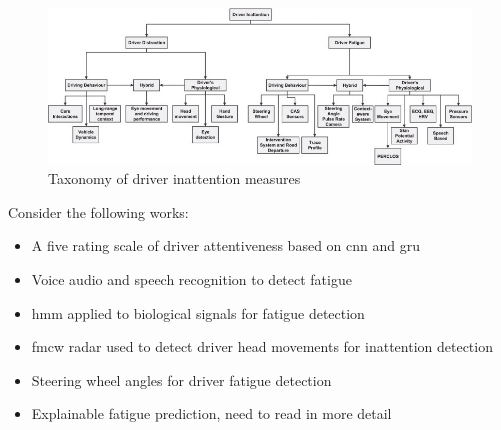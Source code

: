 \documentclass[11pt, parskip=half*,twoside=false]{scrbook}
\begin{document}
\begin{figure} 
	\centering
	\includegraphics[width=\textwidth]{inattention_inputs_taxonomy} 
	\caption{Taxonomy of driver inattention measures}
	\label{fig:taxonomy_measures}
\end{figure}

Consider the following works:
\begin{itemize}
	\item \citet{duaAutoRateHowAttentive2019}  A five rating scale of driver attentiveness based on \gls{cnn} and \gls{gru}
	\item \citet{greeleyDetectingFatigueVoice2006} Voice audio and speech recognition to detect fatigue
	\item \citet{fuDynamicDriverFatigue2016} \gls{hmm} applied to biological signals for fatigue detection
	\item \citet{dingInattentiveDrivingBehavior2019} \gls{fmcw} radar used to detect driver head movements for inattention detection
	\item \citet{liOnlineDetectionDriver2017} Steering wheel angles for driver fatigue detection
	\item \citet{zhouPredictingDriverFatigue2021} Explainable fatigue prediction, need to read in more detail
\end{itemize}
\end{document}
